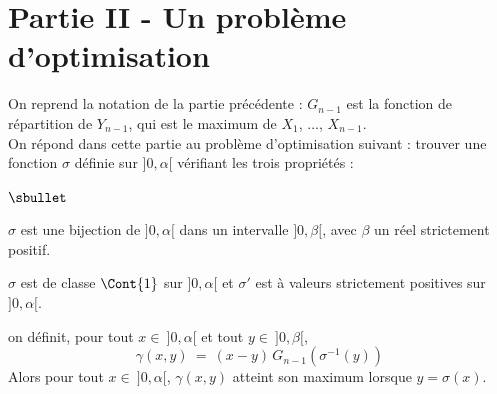 \newpage

\section*{Partie II - Un problème d'optimisation}

\noindent
On reprend la notation de la partie précédente : $G_{n-1}$ est la
fonction de répartition de $Y_{n-1}$, qui est le maximum de $X_1$, 
$\ldots$, $X_{n-1}$.\\
On répond dans cette partie au problème d'optimisation suivant : 
trouver une fonction $\sigma$ définie sur $]0,\alpha[$ vérifiant les 
trois propriétés :
\begin{noliste}{$\sbullet$}
  \item $\sigma$ est une bijection de $]0,\alpha[$ dans un intervalle 
  $]0,\beta[$, avec $\beta$ un réel strictement positif.
  \item $\sigma$ est de classe $\Cont{1}$ sur $]0,\alpha[$ et 
  $\sigma'$ est à valeurs strictement positives sur $]0,\alpha[$.
  \item on définit, pour tout $x \in \ ]0,\alpha[$ et tout $y \in 
  \ ]0, \beta[$,
  \[
    \gamma(x,y) \ = \ (x-y) \, G_{n-1}(\sigma^{-1}(y))
  \]
  Alors pour tout $x \in \ ]0,\alpha[$, $\gamma(x,y)$ atteint son 
  maximum lorsque $y = \sigma(x)$.
\end{noliste}




